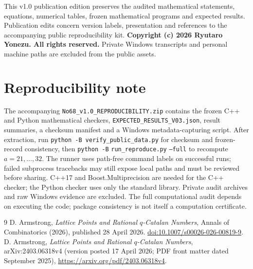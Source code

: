 \documentclass[11pt,a4paper]{article}
\begin{document}
This v1.0 publication edition preserves the audited mathematical statements, equations, numerical tables, frozen mathematical programs and expected results. Publication edits concern version labels, presentation and references to the accompanying public reproducibility kit. \textbf{Copyright (c) 2026 Ryutaro Yonezu. All rights reserved.} Private Windows transcripts and personal machine paths are excluded from the public assets.

\section*{Reproducibility note}
The accompanying \nolinkurl{No68_v1.0_REPRODUCIBILITY.zip} contains the frozen C++ and Python mathematical checkers, \nolinkurl{EXPECTED_RESULTS_V03.json}, result summaries, a checksum manifest and a Windows metadata-capturing script. After extraction, run \texttt{python -B}\ \nolinkurl{verify_public_data.py} for checksum and frozen-record consistency, then \texttt{python -B} \nolinkurl{run_reproduce.py} \texttt{--full} to recompute $a=21,\ldots,32$. The runner uses path-free command labels on successful runs; failed subprocess tracebacks may still expose local paths and must be reviewed before sharing. C++17 and Boost.Multiprecision are needed for the C++ checker; the Python checker uses only the standard library. Private audit archives and raw Windows evidence are excluded. The full computational audit depends on executing the code; package consistency is not itself a computation certificate.

\begin{thebibliography}{9}
D. Armstrong, \emph{Lattice Points and Rational $q$-Catalan Numbers},
Annals of Combinatorics (2026), published 28 April 2026.
\href{https://doi.org/10.1007/s00026-026-00819-9}{doi:10.1007/s00026-026-00819-9}.
D. Armstrong, \emph{Lattice Points and Rational $q$-Catalan Numbers},
arXiv:2403.06318v4 (version posted 17 April 2026; PDF front matter dated September 2025),
\url{https://arxiv.org/pdf/2403.06318v4}.
\end{thebibliography}
\appendix
\end{document}
